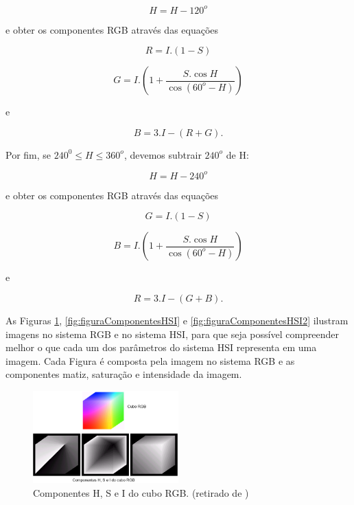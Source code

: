 \documentclass[	12pt, Times, openright, twoside, a4paper, english, brazil]{abntex2}
\begin{document}
\begin{equation}
H=H-120^o
\end{equation}

e obter os componentes RGB através das equações

\begin{equation}
R=I . (1-S)
\end{equation}

\begin{equation}
G=I  . \left( 1 +  \frac{S . \cos{H}}{\cos{(60^o - H)}} \right)
\end{equation}

e

\begin{equation}
B=3 . I-(R+G).
\end{equation}

Por fim, se $240^0 \leq H \leq 360^o$, devemos subtrair $240^o$ de H:

\begin{equation}
H=H-240^o
\end{equation}

e obter os componentes RGB através das equações

\begin{equation}
G=I . (1-S)
\end{equation}

\begin{equation}
B=I  . \left( 1 +  \frac{S . \cos{H}}{\cos{(60^o - H)}} \right)
\end{equation}

e

\begin{equation}
R=3 . I-(G+B).
\end{equation}

As Figuras \ref{fig:figuraCuboRGB}, \ref{fig:figuraComponentesHSI} e \ref{fig:figuraComponentesHSI2} ilustram imagens no sistema RGB e no sistema HSI, para que seja possível compreender melhor o que cada um dos parâmetros do sistema HSI representa em uma imagem. Cada Figura é composta pela imagem no sistema RGB e as componentes matiz, saturação e intensidade da imagem.

\begin{figure}[!htb]
\centering \includegraphics[width=0.5\textwidth]{figuraCuboRGB.png}
\caption{Componentes H, S e I do cubo RGB. (retirado de ) \label{fig:figuraCuboRGB}}
\end{figure}
\end{document}
